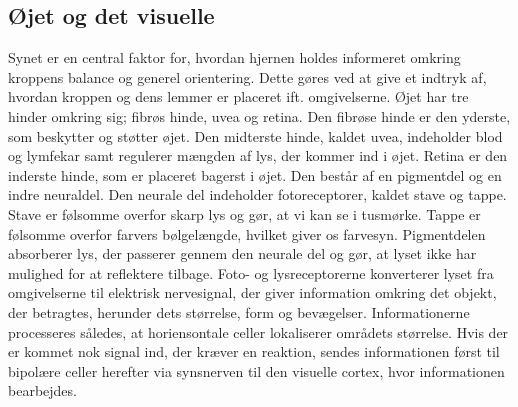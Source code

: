 \subsection{Øjet og det visuelle}
Synet er en central faktor for, hvordan hjernen holdes informeret omkring kroppens balance og generel orientering. Dette gøres ved at give et indtryk af, hvordan kroppen og dens lemmer er placeret ift. omgivelserne. Øjet har tre hinder omkring sig; fibrøs hinde, uvea og retina. Den fibrøse hinde er den yderste, som beskytter og støtter øjet. Den midterste hinde, kaldet uvea, indeholder blod og lymfekar samt regulerer mængden af lys, der kommer ind i øjet. Retina er den inderste hinde, som er placeret bagerst i øjet. Den består af en pigmentdel og en indre neuraldel. Den neurale del indeholder fotoreceptorer, kaldet stave og tappe. Stave er følsomme overfor skarp lys og gør, at vi kan se i tusmørke. Tappe er følsomme overfor farvers bølgelængde, hvilket giver os farvesyn. Pigmentdelen absorberer lys, der passerer gennem den neurale del og gør, at lyset ikke har mulighed for at reflektere tilbage. Foto- og lysreceptorerne konverterer lyset fra omgivelserne til elektrisk nervesignal, der giver information omkring det objekt, der betragtes, herunder dets størrelse, form og bevægelser. Informationerne processeres således, at horiensontale celler lokaliserer områdets størrelse. Hvis der er kommet nok signal ind, der kræver en reaktion, sendes informationen først til bipolære celler herefter via synsnerven til den visuelle cortex, hvor informationen bearbejdes. \cite{Martini2012}     


